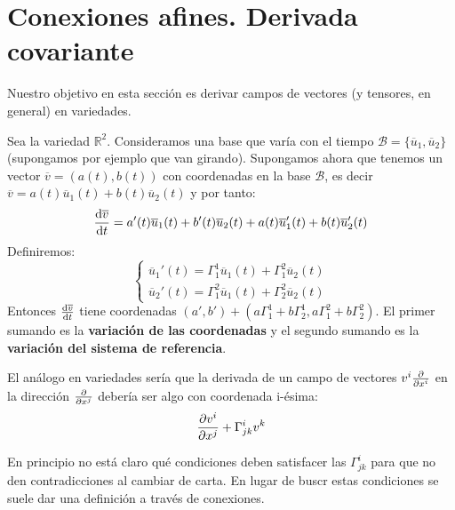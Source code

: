 \documentclass[palatino, bibnumbers]{apuntes}
\begin{document}
\section{Conexiones afines. Derivada covariante}
Nuestro objetivo en esta sección es derivar campos de vectores (y tensores, en general) en variedades. 
\begin{example}
Sea la variedad $ℝ^2$. Consideramos una base que varía con el tiempo $\mathcal{B}=\{\overline{u}_1,\overline{u}_2\}$ (supongamos por ejemplo que van girando). Supongamos ahora que tenemos un vector $\overline{v}=(a(t),b(t))$ con coordenadas en la base $\mathcal{B}$, es decir $\overline{v}=a(t)\overline{u}_1(t)+b(t)\overline{u}_2(t)$ y por tanto:
$$\dv{\overline{v}}{t}=a'(t)\overline{u}_1(t)+b'(t)\overline{u}_2(t)+a(t)\overline{u}_1'(t)+b(t)\overline{u}_2'(t)$$ Definiremos: $$\begin{cases}
\overline{u}_1'(t)=\Gamma_1^1\overline{u}_1(t)+\Gamma^2_1\overline{u}_2(t)\\\overline{u}_2'(t)=\Gamma_1^2\overline{u}_1(t)+\Gamma^2_2\overline{u}_2(t)
\end{cases}$$
Entonces $\dv{\overline{v}}{t}$ tiene coordenadas $(a',b')+(a\Gamma^1_1+b\Gamma^1_2,a\Gamma^2_1+b\Gamma^2_2)$. El primer sumando es la \textbf{variación de las coordenadas} y el segundo sumando es la \textbf{variación del sistema de referencia}.
\end{example}

El análogo en variedades sería que la derivada de un campo de vectores $v^i\pdv{x^i}$ en la dirección $\pdv{x^j}$ debería ser algo con coordenada i-ésima: $$\pdv{v^i}{x^j}+\Gamma^i_{jk}v^k$$
\begin{obs} En principio no está claro qué condiciones deben satisfacer las $\Gamma^i_{jk}$ para que no den contradicciones al cambiar de carta. En lugar de buscr estas condiciones se suele dar una definición a través de conexiones.
\end{obs}
\end{document}
